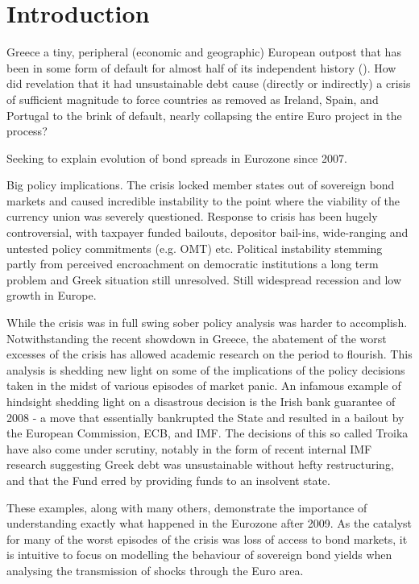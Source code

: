 \documentclass[/../base.tex]{subfiles}
\begin{document}
\section{Introduction}
\label{intro}

Greece a tiny, peripheral (economic and geographic) European outpost that has been in some form of default for almost half of its independent history (\cite{kalyvas2015modern}). How did revelation that it had unsustainable debt cause (directly or indirectly) a crisis of sufficient magnitude to force countries as removed as Ireland, Spain, and Portugal to the brink of default, nearly collapsing the entire Euro project in the process? 

Seeking to explain evolution of bond spreads in Eurozone since 2007.

\cite{whelan2013sovereign}

Big policy implications. The crisis locked member states out of sovereign bond markets and caused incredible instability to the point where the viability of the currency union was severely questioned. Response to crisis has been hugely controversial, with taxpayer funded bailouts, depositor bail-ins, wide-ranging and untested policy commitments (e.g. OMT) etc. Political instability stemming partly from perceived encroachment on democratic institutions a long term problem and Greek situation still unresolved. Still widespread recession and low growth in Europe.  

While the crisis was in full swing sober policy analysis was harder to accomplish. Notwithstanding the recent showdown in Greece, the abatement of the worst excesses of the crisis has allowed academic research on the period to flourish. This analysis is shedding new light on some of the implications of the policy decisions taken in the midst of various episodes of market panic. An infamous example of hindsight shedding light on a disastrous decision is the Irish bank guarantee of 2008 - a move that essentially bankrupted the State and resulted in a bailout by the European Commission, ECB, and IMF. The decisions of this so called Troika have also come under scrutiny, notably in the form of recent internal IMF research suggesting Greek debt was unsustainable without hefty restructuring, and that the Fund erred by providing funds to an insolvent state. 

These examples, along with many others, demonstrate the importance of understanding exactly what happened in the Eurozone after 2009. As the catalyst for many of the worst episodes of the crisis was loss of access to bond markets, it is intuitive to focus on modelling the behaviour of sovereign bond yields when analysing the transmission of shocks through the Euro area. 
\end{document}
